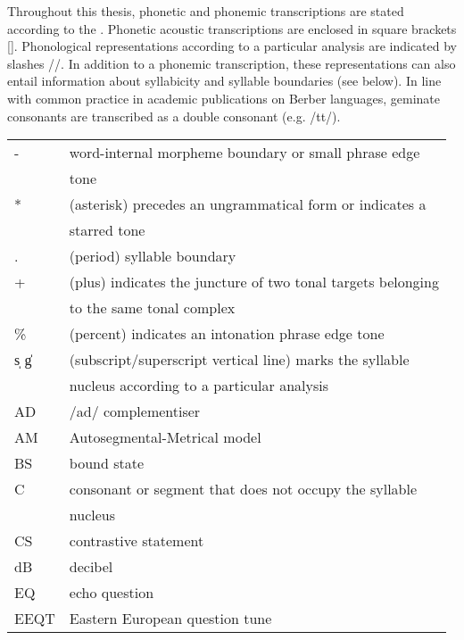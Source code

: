 

Throughout this thesis, phonetic and phonemic transcriptions are stated according to the \citet{IPA1999}. Phonetic acoustic transcriptions are enclosed in square brackets []. Phonological representations according to a particular analysis are indicated by slashes //. In addition to a phonemic transcription, these representations can also entail information about syllabicity and syllable boundaries (see below). In line with common practice in academic publications on Berber languages, geminate consonants are transcribed as a double consonant (e.g. /tt/).


\bigskip 
  \begin{tabular}{ll}
-	 & word-internal morpheme boundary or small phrase edge \\
 	 & tone \\
* 	 & (asterisk) precedes an ungrammatical form or indicates a  \\ 
	 & starred tone \\ 
.	 & (period) syllable boundary \\
+	 & (plus) indicates the juncture of two tonal targets belonging   \\ 
	 & to the same tonal complex \\
\%	 & (percent) indicates an intonation phrase edge tone \\
s̩ g̍	 & (subscript/superscript vertical line) marks the syllable   \\
	 & nucleus according to a particular analysis \\
AD	 & /ad/ complementiser \\
AM  & 	Autosegmental-Metrical model \\
BS	 & bound state \\
C	 & consonant or segment that does not occupy the syllable  \\
 	 & nucleus \\
CS 	 & contrastive statement \\
dB	 & decibel  \\
EQ	 & echo question \\
EEQT	 & Eastern European question tune \\
  \end{tabular}

